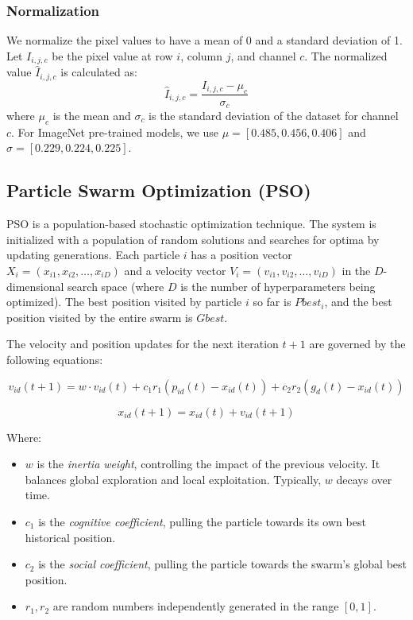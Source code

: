 \documentclass[11pt, a4paper]{article}
\begin{document}
\subsubsection{Normalization}
We normalize the pixel values to have a mean of 0 and a standard deviation of 1. Let $I_{i,j,c}$ be the pixel value at row $i$, column $j$, and channel $c$. The normalized value $\hat{I}_{i,j,c}$ is calculated as:
\begin{equation}
\hat{I}_{i,j,c} = \frac{I_{i,j,c} - \mu_c}{\sigma_c}
\end{equation}
where $\mu_c$ is the mean and $\sigma_c$ is the standard deviation of the dataset for channel $c$. For ImageNet pre-trained models, we use $\mu = [0.485, 0.456, 0.406]$ and $\sigma = [0.229, 0.224, 0.225]$.

\subsection{Particle Swarm Optimization (PSO)}
PSO is a population-based stochastic optimization technique. The system is initialized with a population of random solutions and searches for optima by updating generations.
Each particle $i$ has a position vector $X_i = (x_{i1}, x_{i2}, \dots, x_{iD})$ and a velocity vector $V_i = (v_{i1}, v_{i2}, \dots, v_{iD})$ in the $D$-dimensional search space (where $D$ is the number of hyperparameters being optimized).
The best position visited by particle $i$ so far is $Pbest_i$, and the best position visited by the entire swarm is $Gbest$.

The velocity and position updates for the next iteration $t+1$ are governed by the following equations:

\begin{equation}
v_{id}(t+1) = w \cdot v_{id}(t) + c_1 r_1 (p_{id}(t) - x_{id}(t)) + c_2 r_2 (g_{d}(t) - x_{id}(t))
\end{equation}

\begin{equation}
x_{id}(t+1) = x_{id}(t) + v_{id}(t+1)
\end{equation}

Where:
\begin{itemize}
    \item $w$ is the \textit{inertia weight}, controlling the impact of the previous velocity. It balances global exploration and local exploitation. Typically, $w$ decays over time.
    \item $c_1$ is the \textit{cognitive coefficient}, pulling the particle towards its own best historical position.
    \item $c_2$ is the \textit{social coefficient}, pulling the particle towards the swarm's global best position.
    \item $r_1, r_2$ are random numbers independently generated in the range $[0, 1]$.
\end{itemize}
\end{document}
